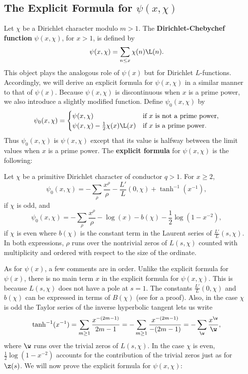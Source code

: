     \subsection*{The Explicit Formula for \texorpdfstring{$\psi(x,\chi)$}{$\psi(x,\chi)$}}
      Let $\chi$ be a Dirichlet character modulo $m > 1$. The \textbf{Dirichlet-Chebychef function} $\psi(x,\chi)$, for $x > 1$, is defined by
      \[
        \psi(x,\chi) = \sum_{n \le x}\chi(n)\L(n).
      \]
      This object plays the analogous role of $\psi(x)$ but for Dirichlet $L$-functions. Accordingly, we will derive an explicit formula for $\psi(x,\chi)$ in a similar manner to that of $\psi(x)$. Because $\psi(x,\chi)$ is discontinuous when $x$ is a prime power, we also introduce a slightly modified function. Define $\psi_{0}(x,\chi)$ by
      \[
        \psi_{0}(x,\chi) = \begin{cases} \psi(x,\chi) & \text{if $x$ is not a prime power}, \\ \psi(x,\chi)-\frac{1}{2}\chi(x)\L(x) & \text{if $x$ is a prime power}. \end{cases}
      \]
      Thus $\psi_{0}(x,\chi)$ is $\psi(x,\chi)$ except that its value is halfway between the limit values when $x$ is a prime power. The \textbf{explicit formula} for $\psi(x,\chi)$ is the following:

      \begin{theorem}
        Let $\chi$ be a primitive Dirichlet character of conductor $q > 1$. For $x \ge 2$,
        \[
          \psi_{0}(x,\chi) = -\sum_{\rho}\frac{x^{\rho}}{\rho}-\frac{L'}{L}(0,\chi)+\tanh^{-1}(x^{-1}),
        \]
        if $\chi$ is odd, and
        \[
          \psi_{0}(x,\chi) = -\sum_{\rho}\frac{x^{\rho}}{\rho}-\log(x)-b(\chi)-\frac{1}{2}\log(1-x^{-2}),
        \]
        if $\chi$ is even where $b(\chi)$ is the constant term in the Laurent series of $\frac{L'}{L}(s,\chi)$. In both expressions, $\rho$ runs over the nontrivial zeros of $L(s,\chi)$ counted with multiplicity and ordered with respect to the size of the ordinate.
      \end{theorem}

      As for $\psi(x)$, a few comments are in order. Unlike the explicit formula for $\psi(x)$, there is no main term $x$ in the explicit formula for $\psi(x,\chi)$. This is because $L(s,\chi)$ does not have a pole at $s = 1$. The constants $\frac{L'}{L}(0,\chi)$ and $b(\chi)$ can be expressed in terms of $B(\chi)$ (see \cite{davenport1980multiplicative} for a proof). Also, in the case $\chi$ is odd the Taylor series of the inverse hyperbolic tangent lets us write
      \[
        \tanh^{-1}(x^{-1}) = \sum_{m \ge 1}\frac{x^{-(2m-1)}}{2m-1} = -\sum_{m \ge 1}\frac{x^{-(2m-1)}}{-(2m-1)} = -\sum_{\w}\frac{x^{\w}}{\w},
      \]
      where $\w$ runs over the trivial zeros of $L(s,\chi)$. In the case $\chi$ is even, $\frac{1}{2}\log(1-x^{-2})$ accounts for the contribution of the trivial zeros just as for $\z(s)$. We will now prove the explicit formula for $\psi(x,\chi)$:

